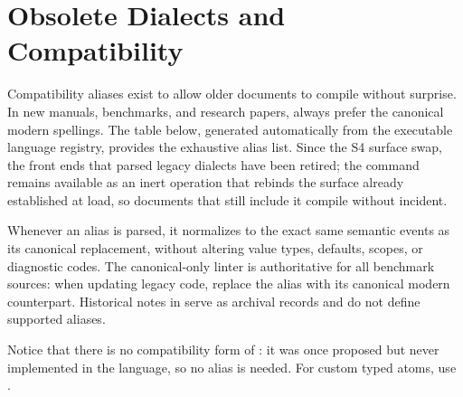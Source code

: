 \section{Obsolete Dialects and Compatibility}\label{ch:compatibility}

Compatibility aliases exist to allow older documents to compile without
surprise.  In new manuals, benchmarks, and research papers, always prefer the
canonical modern spellings.  The table below, generated automatically from the
executable language registry, provides the exhaustive alias list.  Since the S4
surface swap, the front ends that parsed legacy dialects have been retired;
the command  remains available as an inert operation that
rebinds the surface \pkg{} already established at load, so documents that still
include it compile without incident.


Whenever an alias is parsed, it normalizes to the exact same semantic events as
its canonical replacement, without altering value types, defaults, scopes, or
diagnostic codes.  The canonical-only linter is authoritative for all benchmark
sources: when updating legacy code, replace the alias with its canonical modern
counterpart.  Historical notes in  serve as archival
records and do not define supported aliases.

Notice that there is no compatibility form of : it was once
proposed but never implemented in the language, so no alias is needed.  For
custom typed atoms, use .
